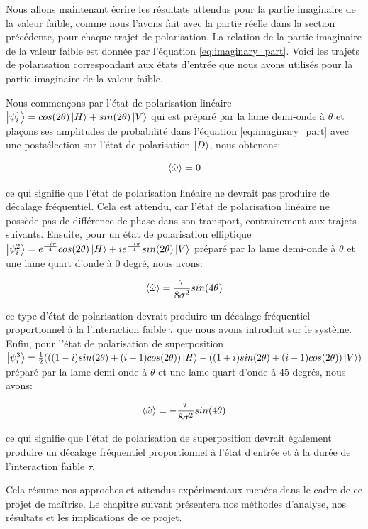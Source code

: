 
\begin{onehalfspace}
    
    Nous allons maintenant écrire les résultats attendus pour 
    la partie imaginaire de la valeur faible, comme nous l'avons fait avec 
    la partie réelle dans la section précédente, pour chaque trajet
    de polarisation. La relation de la partie imaginaire de la valeur faible
    est donnée par l'équation \ref{eq:imaginary_part}. Voici les 
    trajets de polarisation correspondant aux
    états d’entrée que nous avons utilisés pour la
    partie imaginaire de la valeur faible. 
    
    \noindent Nous commençons par l'état de polarisation linéaire
    $\ket{\psi_{i}^{1}} = cos(2\theta)\ket{H} + sin(2\theta)\ket{V}$
    qui est préparé par la lame demi-onde à $\theta$ et plaçons
    ses amplitudes de probabilité dans l'équation
    \ref{eq:imaginary_part} avec une postsélection sur l'état de polarisation
    $\ket{D}$, nous obtenons: 

    \begin{equation}
        \expval{\hat{\omega}} = 0
    \end{equation}

    \noindent ce qui signifie que l'état de polarisation linéaire ne
    devrait pas produire de décalage fréquentiel. Cela est
    attendu, car l'état de polarisation linéaire ne possède pas de 
    différence de phase dans son transport, contrairement aux trajets 
    suivants. Ensuite, pour un état de polarisation elliptique
    $\ket{\psi_{i}^{2}} = e^{\frac{-i\pi}{4}}cos(2\theta)\ket{H} + ie^{\frac{-i\pi}{4}} sin(2\theta)\ket{V}$
    préparé par la lame demi-onde à $\theta$ et une lame quart d'onde 
    à $0$ degré, nous avons:

    \begin{equation}
        \expval{\hat{\omega}} = \frac{\tau}{8\sigma^2}sin(4\theta)\label{eq:expval_omega_circular}
    \end{equation}

    \noindent ce type d'état de polarisation devrait produire un
    décalage fréquentiel proportionnel à la
    l'interaction faible $\tau$ que nous avons introduit sur le système. Enfin, pour l'état de polarisation
    de superposition 
    $\ket{\psi_{i}^{3}} = \frac{1}{2}(((1-i)sin(2\theta)+(i+1)cos(2\theta))\ket{H}
    + ((1+i)sin(2\theta)+(i-1)cos(2\theta))\ket{V})$
    préparé par la lame demi-onde à $\theta$ et une lame quart d'onde à $45$ degrés,
    nous avons:

    \begin{equation}
        \expval{\hat{\omega}} = -\frac{\tau}{8\sigma^2}sin(4\theta)
    \end{equation}

    \noindent ce qui signifie que l'état de polarisation de superposition
    devrait également produire un décalage fréquentiel proportionnel à l'état d'entrée
    et à la durée de l'interaction faible $\tau$.

    \noindent Cela résume nos approches et attendus expérimentaux
    menées dans le cadre de ce projet de maîtrise. Le chapitre suivant
    présentera nos méthodes d'analyse, nos résultats et les implications
    de ce projet.
\end{onehalfspace}